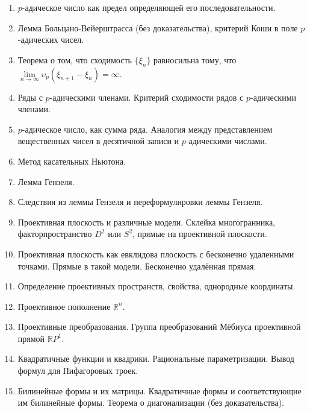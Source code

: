 \documentclass[12pt]{article}
\begin{document}
\begin{enumerate}
    \item $p$-адическое число как предел определяющей его последовательности.

    \item Лемма Больцано-Вейерштрасса (без доказательства), критерий Коши в поле $p$-адических чисел.

    \item Теорема о том, что сходимость $\{ \xi_n \}$ равносильна тому, что $\lim\limits_{n \to \infty} \upsilon_p{(\xi_{n + 1} - \xi_n)} = \infty$.

    \item Ряды с $p$-адическими членами. Критерий сходимости рядов с $p$-адическими членами.

    \item $p$-адическое число, как сумма ряда. Аналогия между представлением вещественных чисел в десятичной записи и $p$-адическими числами.

    \item Метод касательных Ньютона.

    \item Лемма Гензеля.

    \item  Следствия из леммы Гензеля и переформулировки леммы Гензеля.

    \item Проективная плоскость и различные модели. Склейка многогранника, факторпространство $D^2$ или $S^2$, прямые на проективной плоскости.

    \item Проективная плоскость как евклидова плоскость с бесконечно удаленными точками. Прямые в такой модели. Бесконечно удалённая прямая.

    \item Определение проективных пространств, свойства, однородные координаты.

    \item Проективное пополнение $\mathbb{R}^n$.

    \item Проективные преобразования. Группа преобразований Мёбиуса проективной прямой $\mathbb{R}P^1$.

    \item Квадратичные функции и квадрики. Рациональные параметризации. Вывод формул для Пифагоровых троек.

    \item Билинейные формы и их матрицы. Квадратичные формы и соответствующие им  билинейные формы. Теорема о диагонализации (без доказательства).


\end{enumerate}
\end{document}
